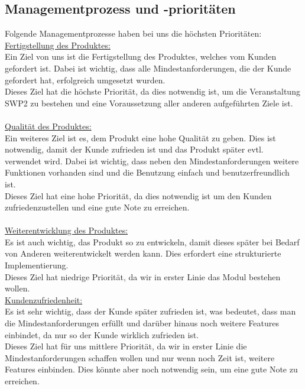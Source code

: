 \documentclass[fontsize=12pt,paper=a4,twoside]{scrartcl}
\begin{document}
\subsection{Managementprozess und -prioritäten}
Folgende Managementprozesse haben bei uns die höchsten Prioritäten:
\bigskip \\
\underline{Fertigstellung des Produktes:} \\
Ein Ziel von uns ist die Fertigstellung des Produktes, welches vom Kunden gefordert ist. Dabei ist wichtig, dass alle Mindestanforderungen, die der Kunde gefordert hat, erfolgreich umgesetzt wurden.\\
Dieses Ziel hat die höchste Priorität, da dies notwendig ist, um die Veranstaltung SWP2 zu bestehen und eine Voraussetzung aller anderen aufgeführten Ziele ist.\\
\bigskip \\
\underline{Qualität des Produktes:} \\
Ein weiteres Ziel ist es, dem Produkt eine hohe Qualität zu geben. Dies ist notwendig, damit der Kunde zufrieden ist und das Produkt später evtl. verwendet wird. Dabei ist wichtig, dass neben den Mindestanforderungen weitere Funktionen vorhanden sind und die Benutzung einfach und benutzerfreundlich ist.\\
Dieses Ziel hat eine hohe Priorität, da dies notwendig ist um den Kunden zufriedenzustellen und eine gute Note zu erreichen.\\
\bigskip \\
\underline{Weiterentwicklung des Produktes:} \\
Es ist auch wichtig, das Produkt so zu entwickeln, damit dieses später bei Bedarf von Anderen weiterentwickelt werden kann. Dies erfordert eine strukturierte Implementierung.\\
Dieses Ziel hat niedrige Priorität, da wir in erster Linie das Modul bestehen wollen.
\bigskip \\
\underline{Kundenzufriedenheit:}\\
Es ist sehr wichtig, dass der Kunde später zufrieden ist, was bedeutet, dass man die Mindestanforderungen erfüllt und darüber hinaus noch weitere Features einbindet, da nur so der Kunde wirklich zufrieden ist. \\
Dieses Ziel hat für uns mittlere Priorität, da wir in erster Linie die Mindestanforderungen schaffen wollen und nur wenn noch Zeit ist, weitere Features einbinden. Dies könnte aber noch notwendig sein, um eine gute Note zu erreichen.\\
\end{document}
